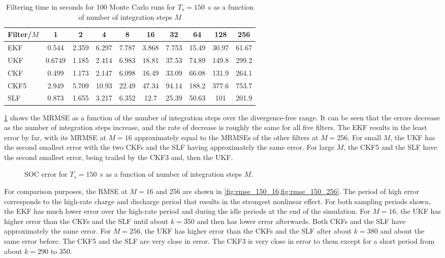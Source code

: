 \documentclass[../zhang_thesis.tex]{subfiles}
\begin{document}
\begin{table}[h]
\centering
\caption{Filtering time in seconds for 100 Monte Carlo runs for $T_s=150$~s as a function of number of integration steps $M$}
\begin{tabular}{@{}lccccccccc@{}}
\toprule
Filter/$M$ & 1      & 2     & 4     & 8     & 16    & 32    & 64    & 128   & 256   \\ \midrule
EKF        & 0.544  & 2.359 & 6.297 & 7.787 & 3.868 & 7.753 & 15.49 & 30.97 & 61.67 \\
UKF        & 0.6749 & 1.185 & 2.414 & 6.983 & 18.81 & 37.53 & 74.89 & 149.8 & 299.2 \\
CKF        & 0.499  & 1.173 & 2.147 & 6.098 & 16.49 & 33.09 & 66.08 & 131.9 & 264.1 \\
CKF5       & 2.949  & 5.709 & 10.93 & 22.49 & 47.34 & 94.14 & 188.2 & 377.6 & 753.7 \\
SLF        & 0.873  & 1.655 & 3.217 & 6.352 & 12.7  & 25.39 & 50.63 & 101   & 201.9 \\ \bottomrule
\end{tabular}
\label{tab:time_150}
\end{table}

\cref{fig:mrmse_150} shows the MRMSE as a function of the number of integration steps over the divergence-free range. It can be seen that the errors decrease as the number of integration steps increase, and the rate of decrease is roughly the same for all five filters. The EKF results in the least error by far, with its MRMSE at $M=16$ approximately equal to the MRMSEs of the other filters at $M=256$. For small $M$, the UKF has the second smallest error with the two CKFs and the SLF having approximately the same error. For large $M$, the CKF5 and the SLF have the second smallest error, being trailed by the CKF3 and, then the UKF.

\begin{figure}[ht]
\centering
%
\caption{SOC error for $T_s=150$~s as a function of number of integration steps $M$.}
\label{fig:mrmse_150}
\end{figure}

For comparison purposes, the RMSE at $M=16$ and 256 are shown in \cref{fig:rmse_150_16,fig:rmse_150_256}. The period of high error corresponds to the high-rate charge and discharge period that results in the strongest nonlinear effect. For both sampling periods shown, the EKF has much lower error over the high-rate period and during the idle periods at the end of the simulation. For $M=16$, the UKF has higher error than the CKFs and the SLF until about $k=350$ and then has lower error afterwards. Both CKFs and the SLF have approximately the same error. For $M=256$, the UKF has higher error than the CKFs and the SLF after about $k=380$ and about the same error before. The CKF5 and the SLF are very close in error. The CKF3 is very close in error to them except for a short period from about $k=290$ to 350.
\end{document}
